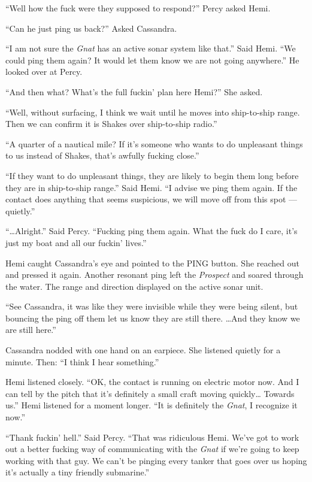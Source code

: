 \documentclass[
]{scrbook}
\begin{document}
``Well how the fuck were they supposed to respond?'' Percy asked Hemi.

``Can he just ping us back?'' Asked Cassandra.

``I am not sure the \emph{Gnat} has an active sonar system like that.''
Said Hemi. ``We could ping them again? It would let them know we are not
going anywhere.'' He looked over at Percy.

``And then what? What's the full fuckin' plan here Hemi?'' She asked.

``Well, without surfacing, I think we wait until he moves into
ship-to-ship range. Then we can confirm it is Shakes over ship-to-ship
radio.''

``A quarter of a nautical mile? If it's someone who wants to do
unpleasant things to us instead of Shakes, that's awfully fucking
close.''

``If they want to do unpleasant things, they are likely to begin them
long before they are in ship-to-ship range.'' Said Hemi. ``I advise we
ping them again. If the contact does anything that seems suspicious, we
will move off from this spot --- quietly.''

``\ldots Alright.'' Said Percy. ``Fucking ping them again. What the fuck
do I care, it's just my boat and all our fuckin' lives.''

Hemi caught Cassandra's eye and pointed to the PING button. She reached
out and pressed it again. Another resonant ping left the \emph{Prospect}
and soared through the water. The range and direction displayed on the
active sonar unit.

``See Cassandra, it was like they were invisible while they were being
silent, but bouncing the ping off them let us know they are still there.
\ldots And they know we are still here.''

Cassandra nodded with one hand on an earpiece. She listened quietly for
a minute. Then: ``I think I hear something.''

Hemi listened closely. ``OK, the contact is running on electric motor
now. And I can tell by the pitch that it's definitely a small craft
moving quickly\ldots{} Towards us.'' Hemi listened for a moment longer.
``It is definitely the \emph{Gnat}, I recognize it now.''

``Thank fuckin' hell.'' Said Percy. ``That was ridiculous Hemi. We've
got to work out a better fucking way of communicating with the
\emph{Gnat} if we're going to keep working with that guy. We can't be
pinging every tanker that goes over us hoping it's actually a tiny
friendly submarine.''
\end{document}
